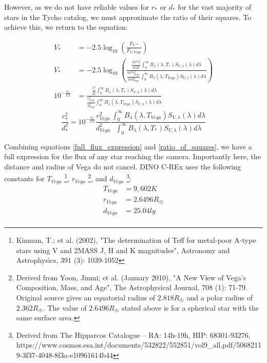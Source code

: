 \documentclass[]{DINOReportMemo}
\begin{document}
However, as we do not have reliable values for $r_*$ or $d_*$ for the vast majority of stars in the Tycho catalog, we must approximate the ratio of their squares. To achieve this, we return to the equation:

\begin{equation}
\begin{split}
V_* &= -2.5\log_{10}\left(\frac{F_{V,*}}{F_{V,Vega}}\right) \\
V_* &= -2.5\log_{10}\left(\frac{
\frac{4\pi^2r_*^2}{4\pi d_*^2} \int_0^\infty  B_{\lambda}(\lambda,T_*)S_{V,\lambda}(\lambda)d\lambda
}{\frac{4\pi^2r_{Vega}^2}{4\pi d_{Vega}^2} \int_0^\infty  B_{\lambda}(\lambda,T_{Vega})S_{V,\lambda}(\lambda)d\lambda}\right) \\
10^{-\frac{V_*}{2.5}} &= \frac{
\frac{r_*^2}{d_*^2} \int_0^\infty  B_{\lambda}(\lambda,T_*)S_{V,\lambda}(\lambda)d\lambda
}{\frac{r_{Vega}^2}{d_{Vega}^2} \int_0^\infty  B_{\lambda}(\lambda,T_{Vega})S_{V,\lambda}(\lambda)d\lambda} 
\end{split}
\end{equation}
\begin{equation} \label{ratio_of_squares}
\frac{r_*^2}{d_*^2} =
10^{-\frac{V_*}{2.5}}
\frac{r^2_{Vega}}{d^2_{Vega}}
\frac{\int_0^\infty  B_{\lambda}(\lambda,T_{Vega})S_{V,\lambda}(\lambda)d\lambda}{\int_0^\infty  B_{\lambda}(\lambda,T_*)S_{V,\lambda}(\lambda)d\lambda}
\end{equation}

Combining equations \ref{full_flux_expression} and \ref{ratio_of_squares}, we have a full expression for the flux of any star reaching the camera. Importantly here, the distance and radius of Vega do not cancel. DINO C-REx uses the following constants for $T_{Vega}$
\footnote{Kinman, T.; et al. (2002), "The determination of Teff for metal-poor A-type stars using V and 2MASS J, H and K magnitudes", Astronomy and Astrophysics, 391 (3): 1039-1052}, $r_{Vega}$
\footnote{Derived from Yoon, Jinmi; et al. (January 2010), "A New View of Vega's Composition, Mass, and Age", The Astrophysical Journal, 708 (1): 71-79. Original source gives an equatorial radius of $2.818 R_\astrosun$ and a polar radius of $2.362 R_\astrosun$. The value of $2.6496 R_{\astrosun}$ stated above is for a spherical star with the same surface area.}, and $d_{Vega}$
\footnote{Derived from The Hipparcos Catalogue -- RA: 14h-19h, HIP: 68301-93276, https://www.cosmos.esa.int/documents/532822/552851/vol9_all.pdf/50682119-3f37-4048-8f3a-e10961614b44}:
\begin{equation}
\begin{split}
    T_{Vega} &= 9,602 K  \\
    r_{Vega} &= 2.6496 R_{\astrosun} \\
    d_{Vega} &= 25.04 ly \\
\end{split}
\end{equation}
\end{document}
